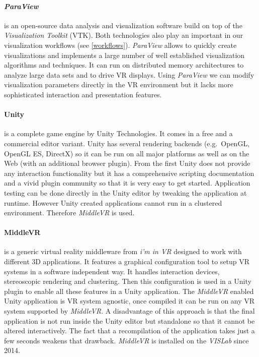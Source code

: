 \paragraph{\emph{ParaView}} \cite{paraview}
is an open-source data analysis and visualization software build on top of the
\emph{Visualization Toolkit} \cite{vtk} (VTK). Both technologies also play an important in
our visualization workflows (see \ref{workflows}). \emph{ParaView} allows to quickly
create visualizations and implements a large number of well established
visualization algorithms and techniques. It can run on distributed memory
architectures to analyze large data sets and to drive VR displays. Using
\emph{ParaView} we can modify visualization parameters directly in the VR environment
but it lacks more sophisticated interaction and presentation features.

\paragraph{Unity}
is a complete game engine by Unity Technologies. It comes in a free and
a commercial editor variant. Unity has several rendering backends
(e.g.~OpenGL, OpenGL ES, DirectX) so it can be run on all major
platforms as well as on the Web (with an additional browser plugin).
From the first Unity does not provide any interaction functionality but
it has a comprehensive scripting documentation and a vivid plugin
community so that it is very easy to get started. Application testing
can be done directly in the Unity editor by tweaking the application at
runtime. However Unity created applications cannot run in a clustered
environment. Therefore \emph{MiddleVR} is used.

\paragraph{MiddleVR}
is a generic virtual reality middleware from \emph{i'm in VR} designed to
work with different 3D applications. It features a graphical
configuration tool to setup VR systems in a software independent way. It
handles interaction devices, stereoscopic rendering and clustering. Then
this configuration is used in a Unity plugin to enable all these
features in a Unity application. The \emph{MiddleVR} enabled Unity application
is VR system agnostic, once compiled it can be run on any VR system
supported by \emph{MiddleVR}. A disadvantage of this approach is that the final
application is not run inside the Unity editor but standalone so that it
cannot be altered interactively. The fact that a recompilation of the
application takes just a few seconds weakens that drawback. \emph{MiddleVR} is
installed on the \emph{VISLab} since 2014.

